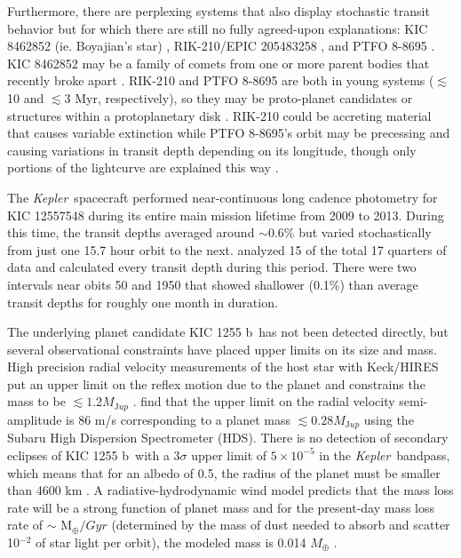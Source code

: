 \documentclass[preprint]{aastex61}
\newcommand{\sha}{KIC 1255 b}
\newcommand{\kepler}{{\it Kepler}}
\begin{document}
Furthermore, there are perplexing systems that also display stochastic transit behavior but for which there are still no fully agreed-upon explanations: KIC 8462852 (ie. Boyajian's star) \citep{boyajian846}, RIK-210/EPIC 205483258 \citep{david2017rik210},  and PTFO 8-8695 \citep{vanEyken2012ptfTTauri}.
KIC 8462852 may be a family of comets from one or more parent bodies that recently broke apart \citep{boyajian846,bodman2016kic8462852cometFamily,wright2016familiesOfSolutions}.
RIK-210 and PTFO 8-8695 are both in young systems ($\lesssim$ 10 and $\lesssim$3 Myr, respectively), so they may be proto-planet candidates or structures within a protoplanetary disk \citep{stauffer2017orbitingClouds,yu2015ptfO8d8695PlanetHypothesisTest}.
RIK-210 could be accreting material that causes variable extinction while PTFO 8-8695's orbit may be precessing and causing variations in transit depth depending on its longitude, though only portions of the lightcurve are explained this way \citep{barnes2013PTFO8d8695NodalPrecession,yu2015ptfO8d8695PlanetHypothesisTest}.

The \kepler\ spacecraft performed near-continuous long cadence photometry for KIC 12557548 during its entire main mission lifetime from 2009 to 2013.
During this time, the transit depths averaged around $\sim$0.6\% but varied stochastically from just one 15.7 hour orbit to the next.
\citet{vanWerkhoven2014} analyzed 15 of the total 17 quarters of data and calculated every transit depth during this period.
There were two intervals near obits 50 and 1950 that showed shallower (0.1\%) than average transit depths for roughly one month in duration.

The underlying planet candidate \sha\ has not been detected directly, but several observational constraints have placed upper limits on its size and mass.
High precision radial velocity measurements of the host star with Keck/HIRES put an upper limit on the reflex motion due to the planet and constrains the mass to be $\lesssim 1.2 M_{\mathrm Jup}$ \citep{croll2014}.
\citet{masuda2018rvKIC1255} find that the upper limit on the radial velocity semi-amplitude is 86 m/s corresponding to a planet mass $\lesssim 0.28 M_{\mathrm Jup}$ using the Subaru High Dispersion Spectrometer (HDS).
There is no detection of secondary eclipses of \sha\ with a 3$\sigma$ upper limit of $5 \times 10^{-5}$ in the \kepler\ bandpass, which means that for an albedo of 0.5, the radius of the planet must be smaller than 4600 km \citep{vanWerkhoven2014}.
A radiative-hydrodynamic wind model predicts that the mass loss rate will be a strong function of planet mass and for the present-day mass loss rate of $\sim$ M$_\oplus/Gyr$ (determined by the mass of dust needed to absorb and scatter 10$^{-2}$ of star light per orbit), the modeled mass is 0.014 $M_\oplus$ \citep{perez-becker}.
\end{document}
